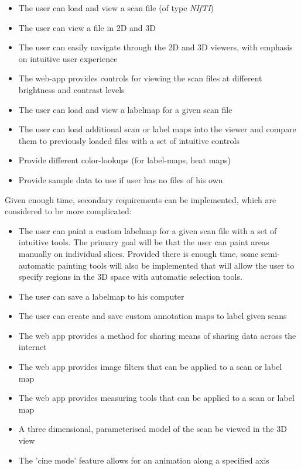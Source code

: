 \documentclass[a4paper,11pt,twoside]{article}
\begin{document}
\begin{itemize}
\item The user can load and view a scan file (of type \textit{NIfTI})
\item The user can view a file in 2D and 3D
\item The user can easily navigate through the 2D and 3D viewers, with emphasis on intuitive user experience
\item The web-app provides controls for viewing the scan files at different brightness and contrast levels
\item The user can load and view a labelmap for a given scan file
\item The user can load additional scan or label maps into the viewer and compare them to previously loaded files with a set of intuitive controls
\item Provide different color-lookups (for label-maps, heat maps)
\item Provide sample data to use if user has no files of his own
\end{itemize}

Given enough time, secondary requirements can be implemented, which are considered to be more complicated:

\begin{itemize}
\item The user can paint a custom labelmap for a given scan file with a set of intuitive tools. The primary goal will be that the user can paint areas manually on individual slices. Provided there is enough time, some semi-automatic painting tools will also be implemented that will allow the user to specify regions in the 3D space with automatic selection tools. 
\item The user can save a labelmap to his computer
\item The user can create and save custom annotation maps to label given scans
\item The web app provides a method for sharing  means of sharing data across the internet
\item The web app provides image filters that can be applied to a scan or label map
\item The web app provides measuring tools that can be applied to a scan or label map
\item A three dimensional, parameterised model of the scan be viewed in the 3D view
\item The 'cine mode' feature allows for an animation along a specified axis
\end{itemize}
\end{document}
